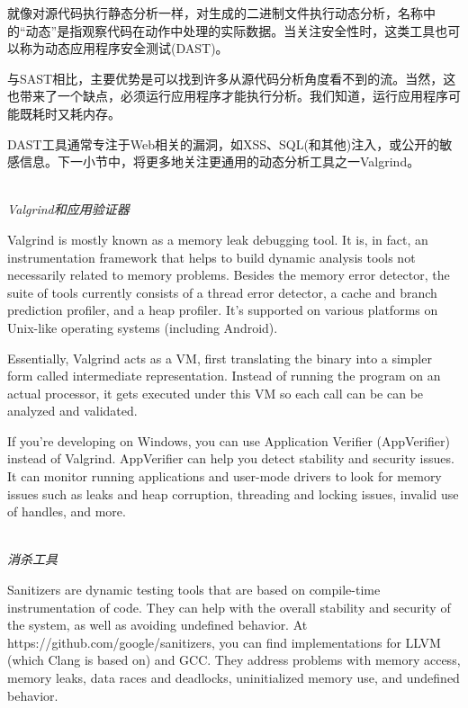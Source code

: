 就像对源代码执行静态分析一样，对生成的二进制文件执行动态分析，名称中的“动态”是指观察代码在动作中处理的实际数据。当关注安全性时，这类工具也可以称为动态应用程序安全测试(DAST)。

与SAST相比，主要优势是可以找到许多从源代码分析角度看不到的流。当然，这也带来了一个缺点，必须运行应用程序才能执行分析。我们知道，运行应用程序可能既耗时又耗内存。

DAST工具通常专注于Web相关的漏洞，如XSS、SQL(和其他)注入，或公开的敏感信息。下一小节中，将更多地关注更通用的动态分析工具之一Valgrind。

\hspace*{\fill} \\ %
\noindent
\textit{Valgrind和应用验证器}

Valgrind is mostly known as a memory leak debugging tool. It is, in fact, an instrumentation framework that helps to build dynamic analysis tools not necessarily related to memory problems. Besides the memory error detector, the suite of tools currently consists of a thread error detector, a cache and branch prediction profiler, and a heap profiler. It's supported on various platforms on Unix-like operating systems (including Android).

Essentially, Valgrind acts as a VM, first translating the binary into a simpler form called intermediate representation. Instead of running the program on an actual processor, it gets executed under this VM so each call can be can be analyzed and validated.

If you're developing on Windows, you can use Application Verifier (AppVerifier) instead of Valgrind. AppVerifier can help you detect stability and security issues. It can monitor running applications and user-mode drivers to look for memory issues such as leaks and heap corruption, threading and locking issues, invalid use of handles, and more.

\hspace*{\fill} \\ %
\noindent
\textit{消杀工具}

Sanitizers are dynamic testing tools that are based on compile-time instrumentation of code. They can help with the overall stability and security of the system, as well as avoiding undefined behavior. At https://github.com/google/sanitizers, you can find implementations for LLVM (which Clang is based on) and GCC. They address problems with memory access, memory leaks, data races and deadlocks, uninitialized memory use,
and undefined behavior.

